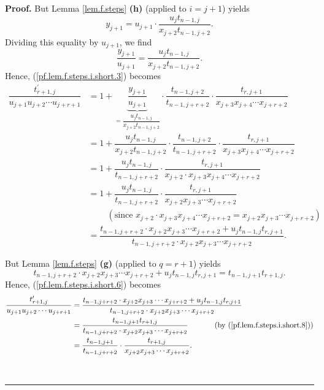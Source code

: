 \documentclass[numbers=enddot,12pt,final,onecolumn,notitlepage]{scrartcl}%
\theoremstyle{definition}
\newenvironment{proof}[1][Proof]{\noindent\textbf{#1.} }{\ \rule{0.5em}{0.5em}}
\newenvironment{vershort}{}{}
\begin{document}
\begin{proof}
\begin{vershort}
But Lemma \ref{lem.f.steps} \textbf{(h)} (applied to $i=j+1$) yields%
\[
y_{j+1}=u_{j+1}\cdot\dfrac{u_{j}t_{n-1,j}}{x_{j+2}t_{n-1,j+2}}.
\]
Dividing this equality by $u_{j+1}$, we find%
\[
\dfrac{y_{j+1}}{u_{j+1}}=\dfrac{u_{j}t_{n-1,j}}{x_{j+2}t_{n-1,j+2}}.
\]
Hence, (\ref{pf.lem.f.steps.i.short.3}) becomes%
\begin{align}
\dfrac{t_{r+1,j}^{\prime}}{u_{j+1}u_{j+2}\cdots u_{j+r+1}}  &
=1+\underbrace{\dfrac{y_{j+1}}{u_{j+1}}}_{=\dfrac{u_{j}t_{n-1,j}}%
{x_{j+2}t_{n-1,j+2}}}\cdot\dfrac{t_{n-1,j+2}}{t_{n-1,j+r+2}}\cdot
\dfrac{t_{r,j+1}}{x_{j+3}x_{j+4}\cdots x_{j+r+2}}\nonumber\\
&  =1+\dfrac{u_{j}t_{n-1,j}}{x_{j+2}t_{n-1,j+2}}\cdot\dfrac{t_{n-1,j+2}%
}{t_{n-1,j+r+2}}\cdot\dfrac{t_{r,j+1}}{x_{j+3}x_{j+4}\cdots x_{j+r+2}%
}\nonumber\\
&  =1+\dfrac{u_{j}t_{n-1,j}}{t_{n-1,j+r+2}}\cdot\dfrac{t_{r,j+1}}{x_{j+2}\cdot
x_{j+3}x_{j+4}\cdots x_{j+r+2}}\nonumber\\
&  =1+\dfrac{u_{j}t_{n-1,j}}{t_{n-1,j+r+2}}\cdot\dfrac{t_{r,j+1}}%
{x_{j+2}x_{j+3}\cdots x_{j+r+2}}\nonumber\\
&  \ \ \ \ \ \ \ \ \ \ \left(  \text{since }x_{j+2}\cdot x_{j+3}x_{j+4}\cdots
x_{j+r+2}=x_{j+2}x_{j+3}\cdots x_{j+r+2}\right) \nonumber\\
&  =\dfrac{t_{n-1,j+r+2}\cdot x_{j+2}x_{j+3}\cdots x_{j+r+2}+u_{j}%
t_{n-1,j}t_{r,j+1}}{t_{n-1,j+r+2}\cdot x_{j+2}x_{j+3}\cdots x_{j+r+2}}.
\label{pf.lem.f.steps.i.short.6}%
\end{align}


But Lemma \ref{lem.f.steps} \textbf{(g)} (applied to $q=r+1$) yields%
\begin{equation}
t_{n-1,j+r+2}\cdot x_{j+2}x_{j+3}\cdots x_{j+r+2}+u_{j}t_{n-1,j}%
t_{r,j+1}=t_{n-1,j+1}t_{r+1,j}. \label{pf.lem.f.steps.i.short.8}%
\end{equation}
Hence, (\ref{pf.lem.f.steps.i.short.6}) becomes%
\begin{align*}
\dfrac{t_{r+1,j}^{\prime}}{u_{j+1}u_{j+2}\cdots u_{j+r+1}}  &  =\dfrac
{t_{n-1,j+r+2}\cdot x_{j+2}x_{j+3}\cdots x_{j+r+2}+u_{j}t_{n-1,j}t_{r,j+1}%
}{t_{n-1,j+r+2}\cdot x_{j+2}x_{j+3}\cdots x_{j+r+2}}\\
&  =\dfrac{t_{n-1,j+1}t_{r+1,j}}{t_{n-1,j+r+2}\cdot x_{j+2}x_{j+3}\cdots
x_{j+r+2}}\ \ \ \ \ \ \ \ \ \ \left(  \text{by (\ref{pf.lem.f.steps.i.short.8}%
)}\right) \\
&  =\dfrac{t_{n-1,j+1}}{t_{n-1,j+r+2}}\cdot\dfrac{t_{r+1,j}}{x_{j+2}%
x_{j+3}\cdots x_{j+r+2}}.
\end{align*}



\end{vershort}
\end{proof}
\end{document}
